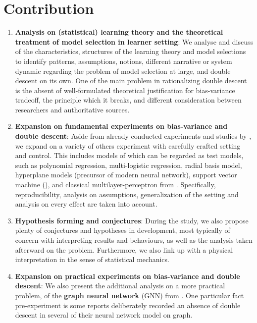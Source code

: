 \documentclass[twoside,10pt]{article}
\begin{document}
\section{Contribution}
\begin{enumerate}[topsep=1pt,itemsep=0.6pt,leftmargin=*]
  \item \textbf{Analysis on (statistical) learning theory and the theoretical treatment of model selection in learner setting}: We analyse and discuss of the characteristics, structures of the learning theory and model selections to identify patterns, assumptions, notions, different narrative or system dynamic regarding the problem of model selection at large, and double descent on its own. One of the main problem in rationalizing double descent is the absent of well-formulated theoretical justification for bias-variance tradeoff, the principle which it breaks, and different consideration between researchers and authoritative sources. 
  \item \textbf{Expansion on fundamental experiments on bias-variance and double descent}: Aside from already conducted experiments and studies by \cite{sharma_bias-variance_2014,schaeffer_double_2023,nakkiran_deep_2019,belkin_reconciling_2019,6797087,unified_bias_composition,Scott_Fortmann_Bias,neal2019biasvariancetradeofftextbooksneed}, we expand on a variety of others experiment with carefully crafted setting and control. This includes models of which can be regarded as test models, such as polynomial regression, multi-logistic regression, radial basis model, hyperplane models (precursor of modern neural network), support vector machine (\cite{Cristianini2000AnIT}), and classical multilayer-perceptron from \cite{goodfellow2016deep}. Specifically, reproducibility, analysis on assumptions, generalization of the setting and analysis on every effect are taken into account. 
  \item \textbf{Hypothesis forming and conjectures}: During the study, we also propose plenty of conjectures and hypotheses in development, most typically of concern with interpreting results and behaviours, as well as the analysis taken afterward on the problem. Furthermore, we also link up with a physical interpretation in the sense of statistical mechanics. 
  \item \textbf{Expansion on practical experiments on bias-variance and double descent}: We also present the additional analysis on a more practical problem, of the \textbf{graph neural network} (GNN) from \cite{GRP_Hamilton,Scar04,lopushanskyy2024graphneuralnetworksgraph,tanis2024introductiongraphneuralnetworks,bronstein2021geometricdeeplearninggrids,Veli_kovi__2023}. One particular fact pre-experiment is some reports deliberately recorded an absence of double descent in several of their neural network model on graph. 
\end{enumerate}
\end{document}
